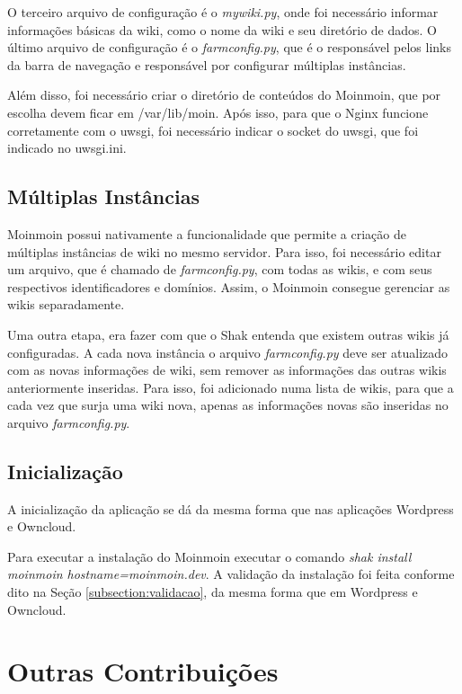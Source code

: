 O terceiro arquivo de configuração é o \textit{mywiki.py}, onde foi necessário
informar informações básicas da wiki, como o nome da wiki e seu diretório de dados. 
O último arquivo de configuração é o \textit{farmconfig.py}, que é o responsável pelos 
links da barra de navegação e responsável por configurar múltiplas instâncias.

Além disso, foi necessário criar o diretório de conteúdos do Moinmoin, que por
escolha devem ficar em /var/lib/moin. Após isso, para que o Nginx funcione corretamente
com o uwsgi, foi necessário indicar o socket do uwsgi, que foi indicado no uwsgi.ini.

\subsection{Múltiplas Instâncias}

Moinmoin possui nativamente a funcionalidade que permite a criação de múltiplas 
instâncias de wiki no mesmo servidor. Para isso, foi necessário editar um arquivo,
que é chamado de \textit{farmconfig.py}, com todas as wikis, e com seus 
respectivos identificadores e domínios. Assim, o Moinmoin consegue gerenciar as 
wikis separadamente. 

Uma outra etapa, era fazer com que o Shak entenda que existem outras wikis já 
configuradas. A cada nova instância
o arquivo \textit{farmconfig.py} deve ser atualizado com as novas 
informações de wiki, sem remover as
informações das outras wikis anteriormente inseridas. Para isso, foi adicionado
numa lista de wikis, para que a cada vez que surja uma wiki nova, apenas as
informações novas são inseridas no arquivo \textit{farmconfig.py}.

\subsection{Inicialização}

A inicialização da aplicação se dá da mesma forma que nas aplicações Wordpress
e Owncloud.

Para executar a instalação do Moinmoin executar o comando \textit{shak install moinmoin hostname=moinmoin.dev}. 
A validação da instalação foi feita conforme dito na Seção \ref{subsection:validacao}, 
da mesma forma que em Wordpress e Owncloud.

\section{Outras Contribuições}
\label{sub:appnencerradas}


